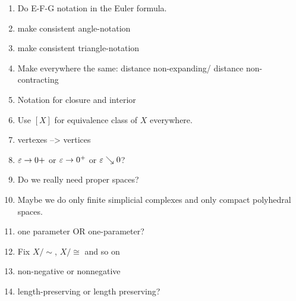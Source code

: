 \begin{enumerate}
\item Do E-F-G notation in the Euler formula.
\item make consistent angle-notation
\item make consistent triangle-notation
\item Make everywhere the same: distance non-expanding/ distance non-contracting
\item Notation for closure and interior
\item Use $[X]$ for equivalence class of $X$ everywhere.
\item vertexes --> vertices
\item $\varepsilon\to 0+$ or $\varepsilon\to 0^+$ or $\varepsilon\searrow 0$?
\item Do we really need proper spaces?
\item Maybe we do only finite simplicial complexes and 
only compact polyhedral spaces.
\item one parameter OR one-parameter?
\item Fix $X/\sim$, $X/\cong$ and so on
\item non-negative or nonnegative
\item length-preserving or length preserving?
\end{enumerate}
